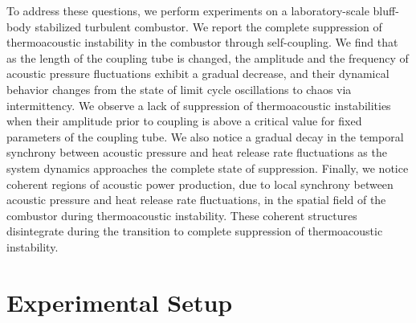 \documentclass[%
preprint,
 amsmath,amssymb,
 aps,
 pra,
]{revtex4-2}
\begin{document}
To address these questions, we perform experiments on a laboratory-scale bluff-body stabilized turbulent combustor. We report the complete suppression of thermoacoustic instability in the combustor through self-coupling. We find that as the length of the coupling tube is changed, the amplitude and the frequency of acoustic pressure fluctuations exhibit a gradual decrease, and their dynamical behavior changes from the state of limit cycle oscillations to chaos via intermittency. We observe a lack of suppression of thermoacoustic instabilities when their amplitude prior to coupling is above a critical value for fixed parameters of the coupling tube. We also notice a gradual decay in the temporal synchrony between acoustic pressure and heat release rate fluctuations as the system dynamics approaches the complete state of suppression. Finally, we notice coherent regions of acoustic power production, due to local synchrony between acoustic pressure and heat release rate fluctuations, in the spatial field of the combustor during thermoacoustic instability. These coherent structures disintegrate during the transition to complete suppression of thermoacoustic instability.

\section{Experimental Setup} \addvspace{10pt}
\end{document}
